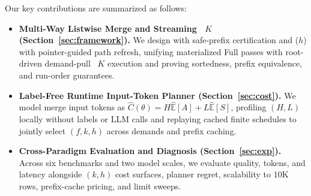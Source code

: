  Our key contributions are summarized as follows:
\begin{itemize}[leftmargin=*,nosep,topsep=2pt]
  \item \textbf{Multi-Way Listwise Merge and Streaming \LIMIT~$K$ (Section~\ref{sec:framework}).} We design \SW{} with safe-prefix certification and \LT($h$) with pointer-guided path refresh, unifying materialized Full passes with root-driven demand-pull \LIMIT~$K$ execution and proving sortedness, prefix equivalence, and run-order guarantees.
  \item \textbf{Label-Free Runtime Input-Token Planner (Section~\ref{sec:cost}).} We model merge input tokens as $\widehat{C}(\theta)=H\widehat{\mathbb{E}}[A]+L\widehat{\mathbb{E}}[S]$, profiling $(H,L)$ locally without labels or LLM calls and replaying cached finite schedules to jointly select $(f,k,h)$ across demands and prefix caching.
  \item \textbf{Cross-Paradigm Evaluation and Diagnosis (Section~\ref{sec:exp}).} Across six benchmarks and two model scales, we evaluate quality, tokens, and latency alongside $(k,h)$ cost surfaces, planner regret, scalability to $10\text{K}$ rows, prefix-cache pricing, and limit sweeps.
\end{itemize}
